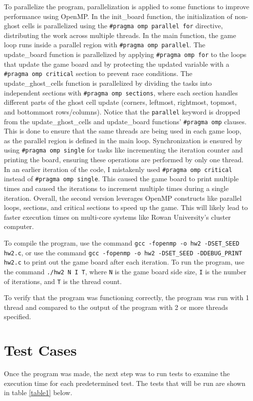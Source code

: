 \documentclass{article}
\begin{document}
	To parallelize the program, parallelization is applied to some functions to improve performance using OpenMP. In the init\_board function, the initialization of non-ghost cells is parallelized using the \texttt{\#pragma omp parallel for} directive, distributing the work across multiple threads. In the main function, the game loop runs inside a parallel region with \texttt{\#pragma omp parallel}. The update\_board function is parallelized by applying \texttt{\#pragma omp for} to the loops that update the game board and by protecting the updated variable with a \texttt{\#pragma omp critical} section to prevent race conditions. The update\_ghost\_cells function is parallelized by dividing the tasks into independent sections with \texttt{\#pragma omp sections}, where each section handles different parts of the ghost cell update (corners, leftmost, rightmost, topmost, and bottommost rows/columns). Notice that the \texttt{parallel} keyword is dropped from the update\_ghost\_cells and update\_board functions’ \texttt{\#pragma omp} clauses. This is done to ensure that the same threads are being used in each game loop, as the parallel region is defined in the main loop. Synchronization is ensured by using \texttt{\#pragma omp single} for tasks like incrementing the iteration counter and printing the board, ensuring these operations are performed by only one thread. In an earlier iteration of the code, I mistakenly used \texttt{\#pragma omp critical} instead of \texttt{\#pragma omp single}. This caused the game board to print multiple times and caused the iterations to increment multiple times during a single iteration. Overall, the second version leverages OpenMP constructs like parallel loops, sections, and critical sections to speed up the game. This will likely lead to faster execution times on multi-core systems like Rowan University’s cluster computer.
	
	To compile the program, use the command \texttt{gcc -fopenmp -o hw2 -DSET\_SEED hw2.c}, or use the command \texttt{gcc -fopenmp -o hw2 -DSET\_SEED -DDEBUG\_PRINT hw2.c} to print out the game board after each iteration. To run the program, use the command \texttt{./hw2 N I T}, where \texttt{N} is the game board side size, \texttt{I} is the number of iterations, and \texttt{T} is the thread count.
	
	To verify that the program was functioning correctly, the program was run with 1 thread and compared to the output of the program with 2 or more threads specified.

	\section{Test Cases}
	Once the program was made, the next step was to run tests to examine the execution time for each predetermined test. The tests that will be run are shown in table \ref{table1} below.
\end{document}
